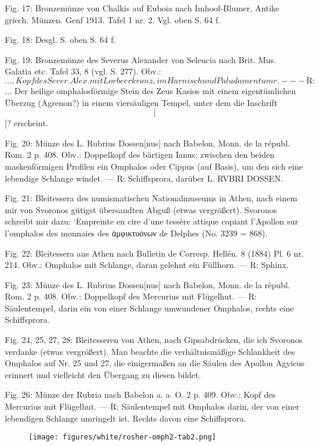 \documentclass[a4paper, 11pt, oneside]{article}
\newcommand*\svgABX{}
\newcommand*\svgABY{}
\newcommand*\svgABZ{}
\newcommand*\svgACA{}
\newcommand*\svgACB{}
\begin{document}
Fig. 17: Bronzemünze von Chalkis auf Euboia nach Imhoof-Blumer, Antike griech. Münzen. Genf 1913. Tafel 1 nr. 2. Vgl. oben S. 64 f.

Fig. 18: Desgl. S. oben S. 64 f.

Fig. 19: Bronzemünze des Severus Alexander von Seleucia nach Brit. Mus. Galatia etc. Tafel 33, 8 (vgl. S. 277). Obv.: $\svgABX\svgABY$..., Kopf des Sever. Alex. mit Lorbeerkranz, im Harnisch und Paludamentum r. --- ℞: $\svgABZ$... Der heilige omphalosförmige Stein des Zeus Kasios mit einem eigentümlichen Überzug (Agrenon?) in einem viersäuligen Tempel, unter dem die Inschrift $\svgACA$[$\svgACB$]? erscheint.

Fig. 20: Münze des L. Rubrius Dossen[nus] nach Babelon, Monn. de la républ. Rom. 2 p. 408. Obv.: Doppelkopf des bärtigen Ianus; zwischen den beiden maskenförmigen Profilen ein Omphalos oder Cippus (auf Basis), um den sich eine lebendige Schlange windet. --- ℞: Schiffsprora, darüber L. RVBRI DOSSEN.

Fig. 21: Bleitessera des numismatischen Nationalmuseums in Athen, nach einem mir von Svoronos gütigst übersandten Abguß (etwas vergrößert). Svoronos schreibt mir dazu: `Empreinte en cire d'une tessère attique copiant l'Apollon sur l'omphalos des monnaies des ἀμφικτυόνων de Delphes (No. 3239 = 868).

Fig. 22: Bleitessera aus Athen nach Bulletin de Corresp. Hellén. 8 (1884) Pl. 6 nr. 214. Obv.: Omphalos mit Schlange, daran gelehnt ein Füllhorn. --- ℞: Sphinx.

Fig. 23: Münze des L. Rubrius Dossen[nus] nach Babelon, Monn. de la républ. Rom. 2 p. 408. Obv.: Doppelkopf des Mercurius mit Flügelhut. --- ℞: Säulentempel, darin ein von einer Schlange umwundener Omphalos, rechts eine Schiffsprora.

Fig. 24, 25, 27, 28: Bleitesseren von Athen, nach Gipsabdrücken, die ich Svoronos verdanke (etwas vergrößert). Man beachte die verhältnismäßige Schlankheit des Omphalos auf Nr. 25 und 27, die einigermaßen an die Säulen des Apollon Agyieus erinnert und vielleicht den Übergang zu diesen bildet.

Fig. 26: Münze der Rubria nach Babelon a. a. O. 2 p. 409. Obv.: Kopf des Mercurius mit Flügelhut. --- ℞: Säulentempel mit Omphalos darin, der von einer lebendigen Schlange umringelt ist. Rechts davon eine Schiffsprora.
\clearpage
\vspace*{\fill}
\begin{figure}[H]
\centering
\texttt{[image: figures/white/rosher-omph2-tab2.png]}
\caption{}
\end{figure}
\vspace*{\fill}
\clearpage
\end{document}
